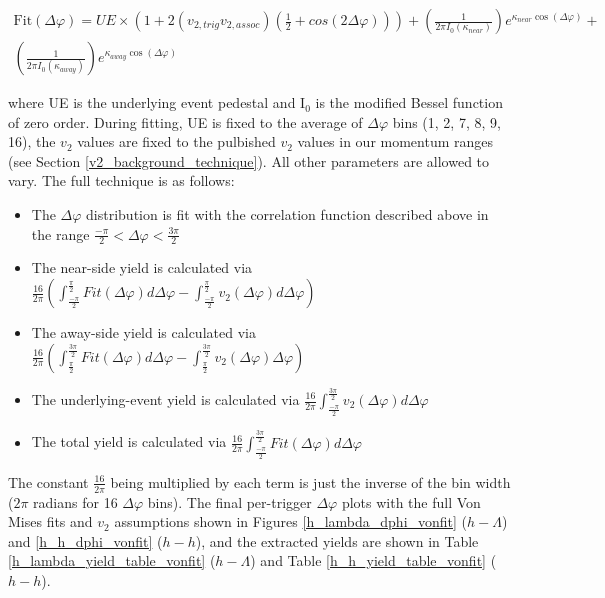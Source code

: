 \documentclass[ALICE,manyauthors]{ALICE_analysis_notes}
\begin{document}
\begin{gather*}
	\text{Fit}(\Delta\varphi) = UE\times(1 + 2(v_{2, trig}v_{2, assoc})(\frac{1}{2} + cos(2\Delta\varphi))) +
	(\frac{1}{2\pi I_{0}(\kappa_{near})})e^{\kappa_{near} \cos(\Delta\varphi)} +  \\
	(\frac{1}{2\pi I_{0}(\kappa_{away})})e^{\kappa_{away} \cos(\Delta\varphi)} 
\end{gather*}

where UE is the underlying event pedestal and I$_0$ is the modified Bessel function of zero order. During fitting, UE is fixed to the average of $\Delta\varphi$ bins (1, 2, 7, 8, 9, 16), the $v_2$ values are fixed to the pulbished $v_2$ values in our momentum ranges (see Section \ref{v2_background_technique}). All other parameters are allowed to vary. The full technique is as follows:

\begin{itemize}
\item The $\Delta\varphi$ distribution is fit with the correlation function described above in the range $\frac{-\pi}{2} < \Delta\varphi < \frac{3\pi}{2}$
\item The near-side yield is calculated via $\frac{16}{2\pi}(\int_{\frac{-\pi}{2}}^{\frac{\pi}{2}}Fit(\Delta\varphi)d\Delta\varphi - \int_{\frac{-\pi}{2}}^{\frac{\pi}{2}}v_{2}(\Delta\varphi) d\Delta\varphi)$
\item The away-side yield is calculated via $\frac{16}{2\pi}(\int_{\frac{\pi}{2}}^{\frac{3\pi}{2}}Fit(\Delta\varphi)d\Delta\varphi - \int_{\frac{\pi}{2}}^{\frac{3\pi}{2}}v_{2}(\Delta\varphi)\Delta\varphi)$
\item The underlying-event yield is calculated via $\frac{16}{2\pi}\int_{\frac{-\pi}{2}}^{\frac{3\pi}{2}}v_{2}(\Delta\varphi) d\Delta\varphi$
\item The total yield is calculated via $\frac{16}{2\pi}\int_{\frac{-\pi}{2}}^{\frac{3\pi}{2}}Fit(\Delta\varphi) d\Delta\varphi$
\end{itemize}

The constant $\frac{16}{2\pi}$ being multiplied by each term is just the inverse of the bin width ($2\pi$ radians for 16 $\Delta\varphi$ bins).
The final per-trigger $\Delta\varphi$ plots with the full Von Mises fits and $v_{2}$ assumptions shown in Figures \ref{h_lambda_dphi_vonfit} ($h-\Lambda$) and \ref{h_h_dphi_vonfit} ($h-h$), and the extracted yields are shown in Table \ref{h_lambda_yield_table_vonfit} ($h-\Lambda$) and Table \ref{h_h_yield_table_vonfit} ($h-h$). 
\end{document}
